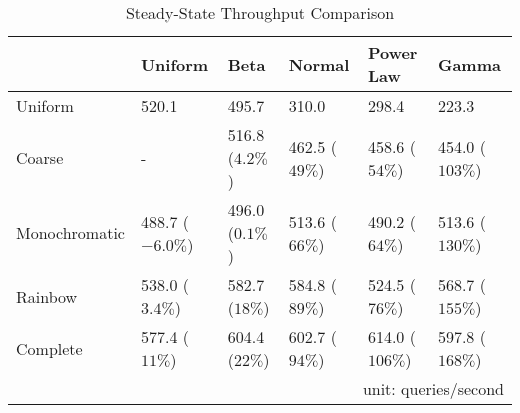 \begin{table*}[t!]
\centering
\caption{Steady-State Throughput Comparison}
\begin{tabular}{llllll}
\toprule
{} &  Uniform & Beta &  Normal &  Power Law &   Gamma \\
\midrule
Uniform          & 520.1           &  495.7          &  310.0           &    298.4           &  223.3 \\
Coarse         & -               &  516.8 ($4.2\%$) &  462.5 ($49\%$)  &    458.6 ($54\%$) &  454.0 ($103\%$) \\
Monochromatic & 488.7 ($-6.0\%$)&  496.0 ($0.1\%$) &  513.6 ($66\%$)  &    490.2 ($64\%$) &  513.6 ($130\%$) \\
Rainbow       & 538.0 ($3.4\%$) &  582.7 ($18\%$) &  584.8 ($89\%$)  &    524.5 ($76\%$) &  568.7 ($155\%$) \\
Complete      & 577.4 ($11\%$) &  604.4 ($22\%$) &  602.7 ($94\%$)  &   614.0 ($106\%$) &  597.8 ($168\%$) \\
\bottomrule
\multicolumn{6}{r}{unit: queries/second} 
\end{tabular}
\label{tab:throughput_comparison}
\end{table*}
